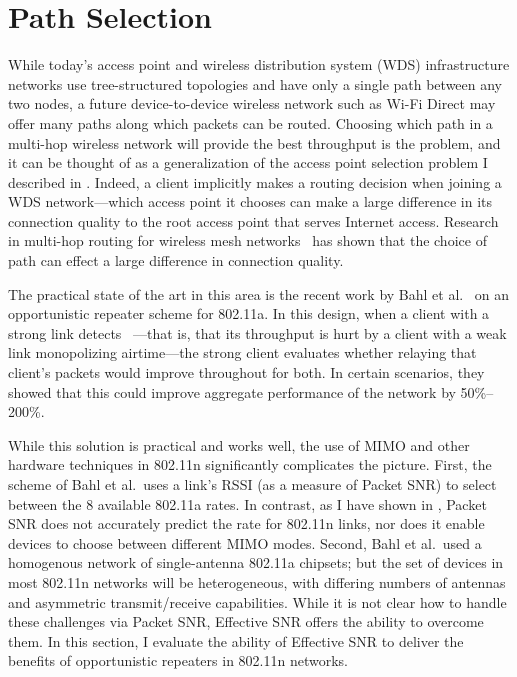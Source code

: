 \section{Path Selection}\label{sec:esnr_pathsel}
While today's access point and wireless distribution system (WDS) infrastructure networks use tree-structured topologies and have only a single path between any two nodes, a future device-to-device wireless network such as Wi-Fi Direct may offer many paths along which packets can be routed. Choosing which path in a multi-hop wireless network will provide the best throughput is the  problem, and it can be thought of as a generalization of the access point selection problem I described in . Indeed, a client implicitly makes a routing decision when joining a WDS network---which access point it chooses can make a large difference in its connection quality to the root access point that serves Internet access. Research in multi-hop routing for wireless mesh networks~\cite{Bahl_repeater,Rodrig_thesis} has shown that the choice of path can effect a large difference in connection quality.

The practical state of the art in this area is the recent work by Bahl et al.~\cite{Bahl_repeater} on an opportunistic repeater scheme for 802.11a. In this design, when a client with a strong link detects ~\cite{Heusse_RateAnomaly}---that is, that its throughput is hurt by a client with a weak link monopolizing airtime---the strong client evaluates whether relaying that client's packets would improve throughout for both. In certain scenarios, they showed that this could improve aggregate performance of the network by 50\%--200\%.

While this solution is practical and works well, the use of MIMO and other hardware techniques in 802.11n significantly complicates the picture. First, the scheme of Bahl et al.\ uses a link's RSSI (as a measure of Packet SNR) to select between the 8 available 802.11a rates. In contrast, as I have shown in , Packet SNR does not accurately predict the rate for 802.11n links, nor does it enable devices to choose between different MIMO modes. Second, Bahl et al.\ used a homogenous network of single-antenna 802.11a chipsets; but the set of devices in most 802.11n networks will be heterogeneous, with differing numbers of antennas and asymmetric transmit/receive capabilities. While it is not clear how to handle these challenges via Packet SNR, Effective SNR offers the ability to overcome them. In this section, I evaluate the ability of Effective SNR to deliver the benefits of opportunistic repeaters in 802.11n networks.

